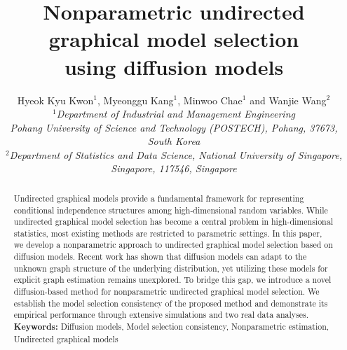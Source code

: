 \documentclass[11pt,a4paper,final]{article}
\numberwithin{equation}{section}
\theoremstyle{remark}
\begin{document}




\thispagestyle{empty}

\title{ \vspace*{-9mm}
Nonparametric undirected graphical model selection
\\
using diffusion models }

\author{
	Hyeok Kyu Kwon$^{1}$, Myeonggu Kang$^{1}$, Minwoo Chae$^{1}$ and Wanjie Wang$^{2}$
	\\ [2mm] \vspace{-0.1 in} 
	{\small\it {}$^{1}$Department of Industrial and Management Engineering}
        \\ 
	{\small\it  Pohang University of Science and Technology (POSTECH), Pohang, 37673, South Korea }
    \\
    {\small\it {}$^{2}$Department of Statistics and Data Science, National University of Singapore, Singapore, 117546, Singapore}
}
\date{}



\maketitle 
\begin{abstract}
    Undirected graphical models provide a fundamental framework for representing conditional independence structures among high-dimensional random variables. While undirected graphical model selection has become a central problem in high-dimensional statistics, most existing methods are restricted to parametric settings. In this paper, we develop a nonparametric approach to undirected graphical model selection based on diffusion models. Recent work has shown that diffusion models can adapt to the unknown graph structure of the underlying distribution, yet utilizing these models for explicit graph estimation remains unexplored. To bridge this gap, we introduce a novel diffusion-based method for nonparametric undirected graphical model selection. We establish the model selection consistency of the proposed method and demonstrate its empirical performance through extensive simulations and two real data analyses.
    \medskip
    \\
    \noindent \textbf{Keywords:} 
    Diffusion models, Model selection consistency, Nonparametric estimation, Undirected graphical models
\end{abstract}
\end{document}
